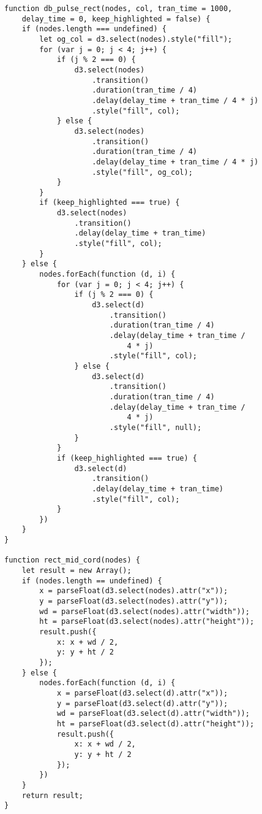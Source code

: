 \begin{lstlisting}
function db_pulse_rect(nodes, col, tran_time = 1000, 
    delay_time = 0, keep_highlighted = false) {
    if (nodes.length === undefined) {
        let og_col = d3.select(nodes).style("fill");
        for (var j = 0; j < 4; j++) {
            if (j % 2 === 0) {
                d3.select(nodes)
                    .transition()
                    .duration(tran_time / 4)
                    .delay(delay_time + tran_time / 4 * j)
                    .style("fill", col);
            } else {
                d3.select(nodes)
                    .transition()
                    .duration(tran_time / 4)
                    .delay(delay_time + tran_time / 4 * j)
                    .style("fill", og_col);
            }
        }
        if (keep_highlighted === true) {
            d3.select(nodes)
                .transition()
                .delay(delay_time + tran_time)
                .style("fill", col);
        }
    } else {
        nodes.forEach(function (d, i) {
            for (var j = 0; j < 4; j++) {
                if (j % 2 === 0) {
                    d3.select(d)
                        .transition()
                        .duration(tran_time / 4)
                        .delay(delay_time + tran_time /
                            4 * j)
                        .style("fill", col);
                } else {
                    d3.select(d)
                        .transition()
                        .duration(tran_time / 4)
                        .delay(delay_time + tran_time / 
                            4 * j)
                        .style("fill", null);
                }
            }
            if (keep_highlighted === true) {
                d3.select(d)
                    .transition()
                    .delay(delay_time + tran_time)
                    .style("fill", col);
            }
        })
    }
}

function rect_mid_cord(nodes) {
    let result = new Array();
    if (nodes.length == undefined) {
        x = parseFloat(d3.select(nodes).attr("x"));
        y = parseFloat(d3.select(nodes).attr("y"));
        wd = parseFloat(d3.select(nodes).attr("width"));
        ht = parseFloat(d3.select(nodes).attr("height"));
        result.push({
            x: x + wd / 2,
            y: y + ht / 2
        });
    } else {
        nodes.forEach(function (d, i) {
            x = parseFloat(d3.select(d).attr("x"));
            y = parseFloat(d3.select(d).attr("y"));
            wd = parseFloat(d3.select(d).attr("width"));
            ht = parseFloat(d3.select(d).attr("height"));
            result.push({
                x: x + wd / 2,
                y: y + ht / 2
            });
        })
    }
    return result;
}


\end{lstlisting}
